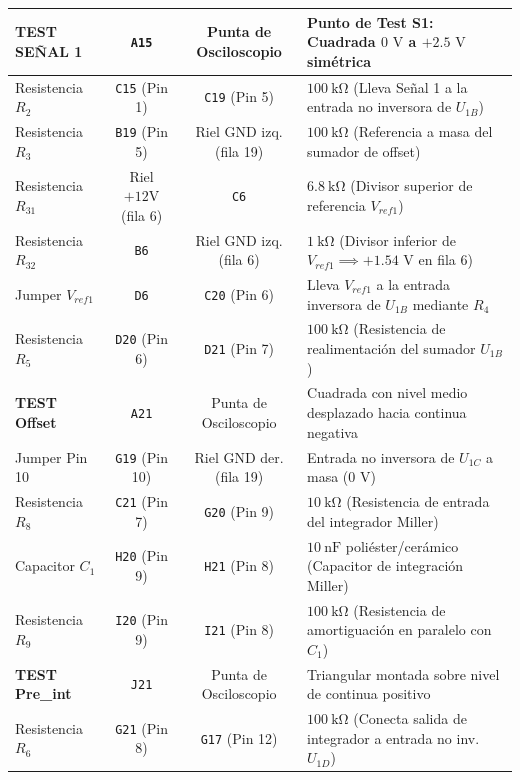\documentclass[10pt, a4paper]{article}
\begin{document}
\begin{center}
\begin{tabularx}{\textwidth}{l c c X}
\textbf{TEST SEÑAL 1} & \texttt{A15} & Punta de Osciloscopio & \textbf{Punto de Test S1}: Cuadrada $0\text{ V}$ a $+2.5\text{ V}$ simétrica \\
\midrule
Resistencia $R_2$ & \texttt{C15} (Pin 1) & \texttt{C19} (Pin 5) & $\SI{100}{\kilo\ohm}$ (Lleva Señal 1 a la entrada no inversora de $U_{1B}$) \\
\rowcolor{softgray} Resistencia $R_3$ & \texttt{B19} (Pin 5) & Riel GND izq. (fila 19) & $\SI{100}{\kilo\ohm}$ (Referencia a masa del sumador de offset) \\
Resistencia $R_{31}$ & Riel $+12\text{V}$ (fila 6) & \texttt{C6} & $\SI{6.8}{\kilo\ohm}$ (Divisor superior de referencia $V_{ref1}$) \\
\rowcolor{softgray} Resistencia $R_{32}$ & \texttt{B6} & Riel GND izq. (fila 6) & $\SI{1}{\kilo\ohm}$ (Divisor inferior de $V_{ref1} \implies +1.54\text{ V}$ en fila 6) \\
Jumper $V_{ref1}$ & \texttt{D6} & \texttt{C20} (Pin 6) & Lleva $V_{ref1}$ a la entrada inversora de $U_{1B}$ mediante $R_4$ \\
\rowcolor{softgray} Resistencia $R_5$ & \texttt{D20} (Pin 6) & \texttt{D21} (Pin 7) & $\SI{100}{\kilo\ohm}$ (Resistencia de realimentación del sumador $U_{1B}$) \\
\textbf{TEST Offset} & \texttt{A21} & Punta de Osciloscopio & Cuadrada con nivel medio desplazado hacia continua negativa \\
\midrule
Jumper Pin 10 & \texttt{G19} (Pin 10) & Riel GND der. (fila 19) & Entrada no inversora de $U_{1C}$ a masa ($0\text{ V}$) \\
\rowcolor{softgray} Resistencia $R_8$ & \texttt{C21} (Pin 7) & \texttt{G20} (Pin 9) & $\SI{10}{\kilo\ohm}$ (Resistencia de entrada del integrador Miller) \\
Capacitor $C_1$ & \texttt{H20} (Pin 9) & \texttt{H21} (Pin 8) & $\SI{10}{\nano\farad}$ poliéster/cerámico (Capacitor de integración Miller) \\
\rowcolor{softgray} Resistencia $R_9$ & \texttt{I20} (Pin 9) & \texttt{I21} (Pin 8) & $\SI{100}{\kilo\ohm}$ (Resistencia de amortiguación en paralelo con $C_1$) \\
\textbf{TEST Pre\_int} & \texttt{J21} & Punta de Osciloscopio & Triangular montada sobre nivel de continua positivo \\
\midrule
Resistencia $R_6$ & \texttt{G21} (Pin 8) & \texttt{G17} (Pin 12) & $\SI{100}{\kilo\ohm}$ (Conecta salida de integrador a entrada no inv. $U_{1D}$) \\

\end{tabularx}
\end{center}
\end{document}
